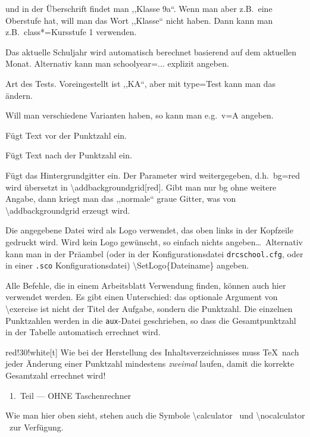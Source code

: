 \documentclass[hyperworksheet,pgfplots]{drcschool}
\newcommand*{\cs}[1]{\textup{\ttfamily\textbackslash#1}}                   %
\newcommand*{\opt}[1]{\textup{\ttfamily#1}}                                %
\newcommand*{\param}[1]{\mbox{\normalfont$\langle$\textit{#1}$\rangle$}}   %
\newcommand*{\TikZ}{\textup{Ti\textit{k}Z}}                                %
\begin{document}
\begin{test}[2,M,class=9a,date=32.\ Oktober 2022,v=A,ptspre=>,ptspost=<,logo=example-image]
\begin{compactdesc}
   und in der Überschrift findet man ,,Klasse 9a``. Wenn man aber z.B.~eine Oberstufe
   hat, will man das Wort ,,Klasse`` nicht haben. Dann kann man z.B.~\opt{class*=Kursstufe 1}
   verwenden.
\item[\ttfamily schoolyear] Das aktuelle Schuljahr wird automatisch berechnet basierend
   auf dem aktuellen Monat. Alternativ kann man \opt{schoolyear=...} explizit angeben.
\item[\ttfamily type] Art des Tests. Voreingestellt ist ,,KA``, aber mit \opt{type=Test} kann man das ändern.
\item[\ttfamily version/variant/v] Will man verschiedene Varianten haben, so kann man
   e.g.~\opt{v=A} angeben.
\item[\ttfamily ptspre/prepts] Fügt Text vor der Punktzahl ein.
\item[\ttfamily ptspost/postpts] Fügt Text nach der Punktzahl ein.
\item[\ttfamily background/bg=\param{\TikZ\ Optionen}] Fügt das Hintergrundgitter ein. Der Parameter wird weitergegeben, d.h.\
   \opt{bg=red} wird übersetzt in \cs{addbackgroundgrid[red]}. Gibt man nur \opt{bg}
   ohne weitere Angabe, dann kriegt man das ,,normale`` graue Gitter, was von
   \cs{addbackgroundgrid} erzeugt wird.
\item[\ttfamily logo=\param{Dateiname}] Die angegebene Datei wird
   als Logo verwendet, das oben links in der Kopfzeile gedruckt wird. Wird kein Logo
   gewünscht, so einfach nichts angeben\ldots\ Alternativ kann man in der Präambel
   (oder in der Konfigurationsdatei \texttt{drcschool.cfg}, oder in einer
   \texttt{.sco} Konfigurationsdatei) \cs{SetLogo\{Dateiname\}} angeben.
\end{compactdesc}

Alle Befehle, die in einem Arbeitsblatt Verwendung finden, können auch hier
verwendet werden. Es gibt einen Unterschied: das optionale Argument von \cs{exercise}
ist nicht der Titel der Aufgabe, sondern die Punktzahl. Die einzelnen Punktzahlen
werden in die \texttt{aux}-Datei geschrieben, so dass die Gesamtpunktzahl in
der Tabelle automatisch errechnet wird.

\noindent
\begin{colorminipage}{red!30!white}[t]{\linewidth}
Wie bei der Herstellung des Inhaltsverzeichnisses muss \TeX\ nach jeder Änderung
einer Punktzahl mindestens \emph{zweimal} laufen, damit die korrekte Gesamtzahl
errechnet wird!
\end{colorminipage}

\begin{center}
\nocalculator\ 1.\ Teil --- OHNE Taschenrechner
\end{center}
Wie man hier oben sieht, stehen auch die Symbole \cs{calculator} \calculator\
und \cs{nocalculator} \nocalculator\ zur Verfügung.


\end{test}
\end{document}

